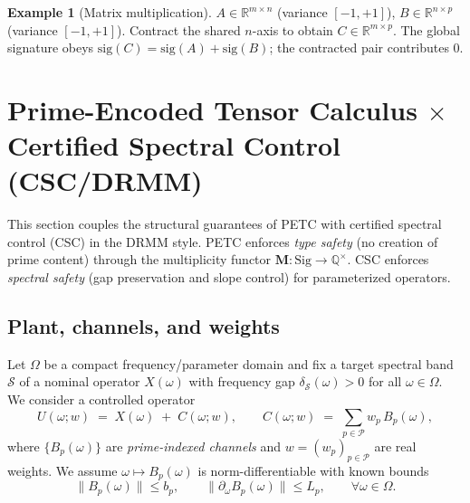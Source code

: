 \documentclass[11pt]{article}
\theoremstyle{plain}
\theoremstyle{definition}
\newtheorem{example}[theorem]{Example}
\newcommand{\Q}{\mathbb{Q}}
\newcommand{\R}{\mathbb{R}}
\newcommand{\Sig}{\mathrm{Sig}}
\newcommand{\M}{\mathbf{M}} %
\begin{document}
\begin{example}[Matrix multiplication]
$A\in\R^{m\times n}$ (variance $[-1,+1]$), $B\in\R^{n\times p}$ (variance $[-1,+1]$). Contract the shared $n$-axis to obtain $C\in\R^{m\times p}$. The global signature obeys $\mathrm{sig}(C)=\mathrm{sig}(A)+\mathrm{sig}(B)$; the contracted pair contributes $0$.
\end{example}


\section{Prime-Encoded Tensor Calculus $\times$ Certified Spectral Control (CSC/DRMM)}\label{sec:petc_csc}

This section couples the structural guarantees of PETC with certified spectral control (CSC) in the DRMM style. PETC enforces \emph{type safety} (no creation of prime content) through the multiplicity functor $\M:\Sig\to\Q^{\times}$. CSC enforces \emph{spectral safety} (gap preservation and slope control) for parameterized operators.

\subsection{Plant, channels, and weights}
Let $\Omega$ be a compact frequency/parameter domain and fix a target spectral band $\mathcal S$ of a nominal operator $X(\omega)$ with frequency gap $\delta_{\mathcal S}(\omega)>0$ for all $\omega\in\Omega$. We consider a controlled operator
\[
  U(\omega;w)\;=\;X(\omega)\; +\; C(\omega;w),\qquad
  C(\omega;w)\;=\;\sum_{p\in\mathcal P} w_p\,B_p(\omega),
\]
where $\{B_p(\omega)\}$ are \emph{prime-indexed channels} and $w=(w_p)_{p\in\mathcal P}$ are real weights. We assume $\omega\mapsto B_p(\omega)$ is norm-differentiable with known bounds
\[
  \|B_p(\omega)\|\le b_p,\qquad \|\partial_\omega B_p(\omega)\|\le L_p,\qquad \forall\omega\in\Omega.
\]
\end{document}
